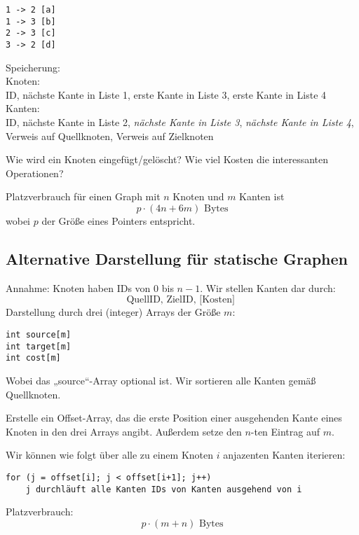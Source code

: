 \documentclass{mycourse}
\begin{document}
\begin{ex}\- 
\begin{verbatim}
1 -> 2 [a]
1 -> 3 [b]
2 -> 3 [c]
3 -> 2 [d]
\end{verbatim}
\end{ex}

Speicherung:\\
Knoten:\\
ID, nächste Kante in Liste 1, erste Kante in Liste 3, erste Kante in Liste 4
Kanten:\\
ID, nächste Kante in Liste 2, \emph{nächste Kante in Liste 3}, \emph{nächste Kante in Liste 4}, Verweis auf Quellknoten, Verweis auf Zielknoten

\begin{note}[Übung]
Wie wird ein Knoten eingefügt/gelöscht?
Wie viel Kosten die interessanten Operationen?
\end{note}

Platzverbrauch für einen Graph mit $n$ Knoten und $m$ Kanten ist
\[
p\cdot(4n + 6m) \text{ Bytes}
\]
wobei $p$ der Größe eines Pointers entspricht.


\subsection{Alternative Darstellung für statische Graphen}
Annahme: Knoten haben IDs von $0$ bis $n-1$.
Wir stellen Kanten dar durch:
\[
\text{QuellID, ZielID, [Kosten] }
\]
Darstellung durch drei (integer) Arrays der Größe $m$:
\begin{verbatim}
int source[m]
int target[m]
int cost[m]
\end{verbatim}
Wobei das „source“-Array optional ist.
Wir sortieren alle Kanten gemäß Quellknoten.

Erstelle ein Offset-Array, das die erste Position einer ausgehenden Kante eines Knoten in den drei Arrays angibt.
Außerdem setze den $n$-ten Eintrag auf $m$.

Wir können wie folgt über alle zu einem Knoten $i$ anjazenten Kanten iterieren:
\begin{verbatim}
for (j = offset[i]; j < offset[i+1]; j++)
    j durchläuft alle Kanten IDs von Kanten ausgehend von i
\end{verbatim}

Platzverbrauch:
\[
p\cdot (m+n) \text{ Bytes}
\]
\end{document}
